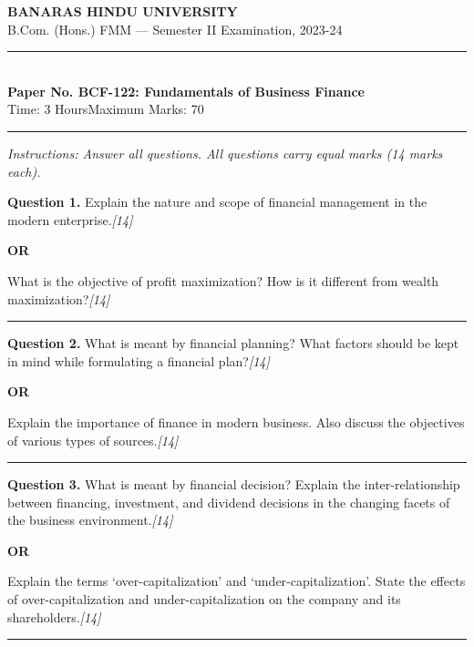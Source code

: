 \documentclass[11pt,a4paper]{article}
\newcommand{\pts}[1]{\hfill   \textit{[#1]}}
\begin{document}
\begin{center}
  {\large\bfseries BANARAS HINDU UNIVERSITY}\\[2pt]
  {\normalsize B.Com. (Hons.) FMM --- Semester II Examination, 2023-24}\\[6pt]
  \rule{0.8\linewidth}{0.5pt}\\[6pt]
  {\large\bfseries Paper No. BCF-122: Fundamentals of Business Finance}\\[4pt]
  {\normalsize Time: 3 Hours\hfill Maximum Marks: 70}
\end{center}

\rule{\linewidth}{0.4pt}

\smallskip



\noindent   \textit{Instructions: Answer all questions. All questions carry equal marks (14 marks each).}

\bigskip




\noindent   \textbf{Question 1.}
Explain the nature and scope of financial management in the modern enterprise.\pts{14}

\centerline{   \textbf{OR}}

What is the objective of profit maximization? How is it different from wealth maximization?\pts{14}

\medskip\rule{\linewidth}{0.2pt}




\noindent   \textbf{Question 2.}
What is meant by financial planning? What factors should be kept in mind while formulating a financial plan?\pts{14}

\centerline{   \textbf{OR}}

Explain the importance of finance in modern business. Also discuss the objectives of various types of sources.\pts{14}

\medskip\rule{\linewidth}{0.2pt}




\noindent   \textbf{Question 3.}
What is meant by financial decision? Explain the inter-relationship between financing, investment, and dividend decisions in the changing facets of the business environment.\pts{14}

\centerline{   \textbf{OR}}

Explain the terms `over-capitalization' and `under-capitalization'. State the effects of over-capitalization and under-capitalization on the company and its shareholders.\pts{14}

\medskip\rule{\linewidth}{0.2pt}
\end{document}
